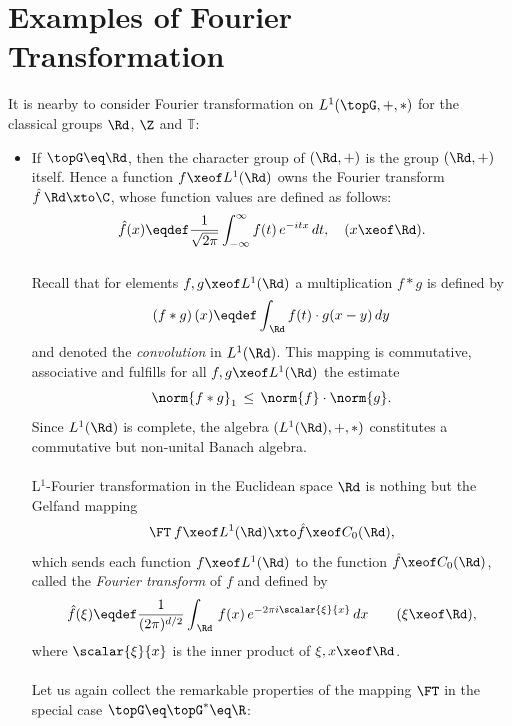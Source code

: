 \documentclass[11pt,twoside]{article}
\begin{document}
\section{Examples of Fourier Transformation}
It is nearby to consider Fourier transformation
on $L^1(\topG,+,\ast)$ for the classical groups
$\Rd$, $\Z$ and $\mathbb{T}$:

\begin{itemize}[leftmargin=12pt]
\item[1.]
If $\topG \eq \Rd$,
then the character group of $(\Rd,+)$ is the group $(\Rd,+)$ itself.
Hence a function $f \xeof L^1(\Rd)$ owns the Fourier transform
$\hat{f} \: \Rd \xto \C$,
whose function values are defined as follows:
\[
\hat{f}(x) \eqdef
\frac{1}{\sqrt{2\pi}} \int_{- \infty}^{\infty} f(t) \, e^{-itx} \, dt,
\quad (x \xeof \Rd).
\]

\subparagraph{} %
Recall that for elements $f,g \xeof L^1(\Rd)$ 
a multiplication $f \ast g$ is defined by
\[
(f \ast g) \, (x) \eqdef \int_{\,\Rd} f(t) \cdot g(x-y) \, dy
\]
and denoted the \textit{convolution} in $L^1(\Rd)$.
This mapping is commutative, associative and fulfills
for all $f,g \xeof L^1(\Rd)$ the estimate
\[
\norm{f \ast g}_1 \, \leq \, \norm{f} \cdot \norm{g}.
\]
Since $L^1(\Rd)$ is complete,
the algebra $(L^1(\Rd),+,\ast)$
constitutes a commutative but non-unital Banach algebra.

\paragraph{} %
L$^1$-Fourier transformation in the Euclidean space $\Rd$
is nothing but the Gelfand mapping
\[
\FT \: f \xeof L^1(\Rd) \xto \hat{f} \xeof C_0(\Rd),
\]
which sends each function $f \xeof L^1(\Rd)$
to the function $\hat{f} \xeof C_0(\Rd)$,
called the \textit{Fourier transform} of $f$ and defined by
\begin{equation}\label{VII_L1_FOURIER_TRANSFORM}
\hat{f}(\xi) \eqdef
\frac{1}{(2 \pi)^{d/2}}
\int_{\,\Rd} \, f(x) \, e^{-2 \pi i \scalar{\xi}{x}} \, dx
\quad \quad (\xi \xeof \Rd),
\end{equation}
where $\scalar{\xi}{x}$ is the inner product of $\xi,x \xeof \Rd$.

\paragraph{} %
Let us again collect the remarkable properties of the mapping $\FT$
in the special case $\topG \eq \topG^* \eq \R$:


\end{itemize}
\end{document}

